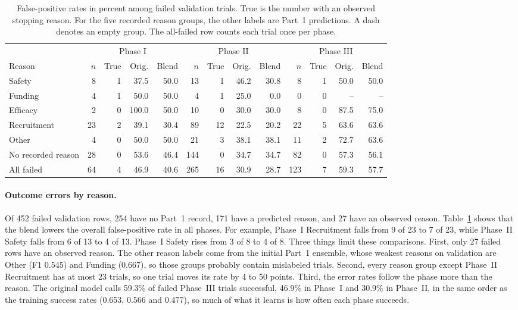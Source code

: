 \documentclass[10pt,twocolumn,letterpaper]{article}
\begin{document}
\begin{table}[!t]
\centering
\footnotesize
\setlength{\tabcolsep}{5pt}
\begin{tabular}{lrrrrrrrrrrrr}
\toprule
 & \multicolumn{4}{c}{Phase I} & \multicolumn{4}{c}{Phase II} & \multicolumn{4}{c}{Phase III} \\
Reason & $n$ & True & Orig. & Blend & $n$ & True & Orig. & Blend & $n$ & True & Orig. & Blend \\
\midrule
Safety & 8 & 1 & 37.5 & 50.0 & 13 & 1 & 46.2 & 30.8 & 8 & 1 & 50.0 & 50.0 \\
Funding & 4 & 1 & 50.0 & 50.0 & 4 & 1 & 25.0 & 0.0 & 0 & 0 & -- & -- \\
Efficacy & 2 & 0 & 100.0 & 50.0 & 10 & 0 & 30.0 & 30.0 & 8 & 0 & 87.5 & 75.0 \\
Recruitment & 23 & 2 & 39.1 & 30.4 & 89 & 12 & 22.5 & 20.2 & 22 & 5 & 63.6 & 63.6 \\
Other & 4 & 0 & 50.0 & 50.0 & 21 & 3 & 38.1 & 38.1 & 11 & 2 & 72.7 & 63.6 \\
No recorded reason & 28 & 0 & 53.6 & 46.4 & 144 & 0 & 34.7 & 34.7 & 82 & 0 & 57.3 & 56.1 \\
All failed & 64 & 4 & 46.9 & 40.6 & 265 & 16 & 30.9 & 28.7 & 123 & 7 & 59.3 & 57.7 \\
\bottomrule
\end{tabular}
\caption{False-positive rates in percent among failed validation trials. True is the number with an observed stopping reason. For the five recorded reason groups, the other labels are Part~1 predictions. A dash denotes an empty group. The all-failed row counts each trial once per phase.}
\label{tab:outcome-errors}
\end{table}

\paragraph{Outcome errors by reason.}
Of 452 failed validation rows, 254 have no Part~1 record, 171 have a predicted reason, and 27 have an observed reason. Table~\ref{tab:outcome-errors} shows that the blend lowers the overall false-positive rate in all phases. For example, Phase~I Recruitment falls from 9 of 23 to 7 of 23, while Phase~II Safety falls from 6 of 13 to 4 of 13. Phase~I Safety rises from 3 of 8 to 4 of 8.
Three things limit these comparisons.
First, only 27 failed rows have an observed reason. The other reason labels come from the initial Part~1 ensemble, whose weakest reasons on validation are Other (F1 0.545) and Funding (0.667), so those groups probably contain mislabeled trials.
Second, every reason group except Phase~II Recruitment has at most 23 trials, so one trial moves its rate by 4 to 50 points.
Third, the error rates follow the phase more than the reason. The original model calls 59.3\% of failed Phase~III trials successful, 46.9\% in Phase~I and 30.9\% in Phase~II, in the same order as the training success rates (0.653, 0.566 and 0.477), so much of what it learns is how often each phase succeeds.
\end{document}
